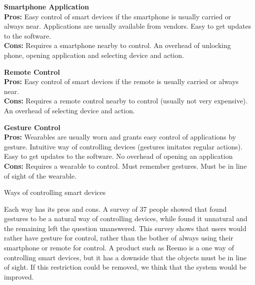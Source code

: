 \begin{table}[!htb]
    \centering
    \parbox[t][][t]{0.3\textwidth}{
        \textbf{Smartphone Application}\\
        \textbf{Pros:} Easy control of smart devices if the smartphone is usually carried or always near. 
                       Applications are usually available from vendors. 
                       Easy to get updates to the software. \\
        \textbf{Cons:} Requires a smartphone nearby to control. 
                       An overhead of unlocking phone, opening application and selecting device and action.
    }\quad
    \parbox[t][][t]{0.3\textwidth}{
        \textbf{Remote Control}\\
        \textbf{Pros:} Easy control of smart devices if the remote is usually carried or always near. \\
        \textbf{Cons:} Requires a remote control nearby to control (usually not very expensive). 
                       An overhead of selecting device and action.
    }\quad
    \parbox[t][][t]{0.3\textwidth}{
        \textbf{Gesture Control}\\
        \textbf{Pros:} Wearables are usually worn and grants easy control of applications by gesture.
                       Intuitive way of controlling devices (gestures imitates regular actions).
                       Easy to get updates to the software. 
                       No overhead of opening an application\\
        \textbf{Cons:} Requires a wearable to control. 
                       Must remember gestures.
                       Must be in line of sight of the wearable.
    }
    \caption{Ways of controlling smart devices}
    \label{tbl:smartcontrol}
\end{table}

Each way has its pros and cons. 
A survey \cite{Kela2006} of 37 people showed that  found gestures to be a natural way of controlling devices, 
while  found it unnatural and the remaining left the question unanswered. 
This survey shows that users would rather have gesture for control, 
rather than the bother of always using their smartphone or remote for control.  
A product such as Reemo is a one way of controlling smart devices, 
but it has a downside that the objects must be in line of sight. 
If this restriction could be removed, 
we think that the system would be improved.

